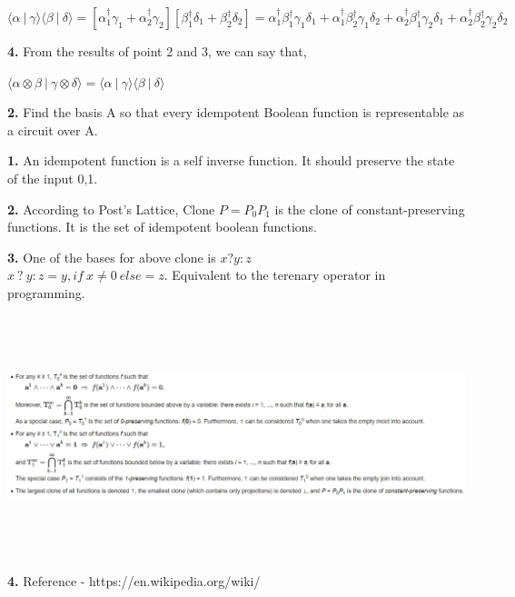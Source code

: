 \documentclass [12pt]{article}
\theoremstyle{definition}
\newcommand{\braket}[2]{\langle #1 \ | \ #2 \rangle}
\newcommand{\tensor}[2]{ #1 \otimes  #2 }
\begin{document}
\phantom{1000em} $\braket{\alpha}{\gamma} \braket{\beta}{\delta} = [\alpha^{\dag}_{1}\gamma_{1} + \alpha^{\dag}_{2}\gamma_{2}][\beta^{\dag}_{1}\delta_{1} + \beta^{\dag}_{2}\delta_{2}] = \alpha^{\dag}_{1}\beta^{\dag}_{1}\gamma_{1}\delta_{1} + \alpha^{\dag}_{1}\beta^{\dag}_{2}\gamma_{1}\delta_{2} + \alpha^{\dag}_{2}\beta^{\dag}_{1}\gamma_{2}\delta_{1} + \alpha^{\dag}_{2}\beta^{\dag}_{2}\gamma_{2}\delta_{2}$

\phantom{1em} {\bf 4.} From the results of point 2 and 3, we can say that,

\phantom{1000em} $\braket{\tensor{\alpha}{\beta}}{\tensor{\gamma}{\delta}} = \braket{\alpha}{\gamma} \braket{\beta}{\delta}$\\

\newpage

{\bf 2.} Find the basis A so that 	every idempotent Boolean function is representable as a circuit over A.

 \phantom{1em} {\bf 1.} An idempotent function is a self inverse function. It should preserve the state of the input 0,1.
 
 \phantom{1em} {\bf 2.} According to Post's Lattice, Clone $P = P_{0}P_{1}$ is the clone of constant-preserving functions. It is the set of idempotent boolean functions.
 
 \phantom{1em} {\bf 3.} One of the bases for above clone is $x ? y : z$\\
 \phantom{1000em}  $x \ ? \ y : z = y, if \ x \neq 0 \ else = z$. Equivalent to the terenary operator in programming. 
 
 \phantom{1000em}\includegraphics[width=15cm, height=7cm]{I55} 
 
 \phantom{1em} {\bf 4.} Reference - https://en.wikipedia.org/wiki/
 
\end{document}
